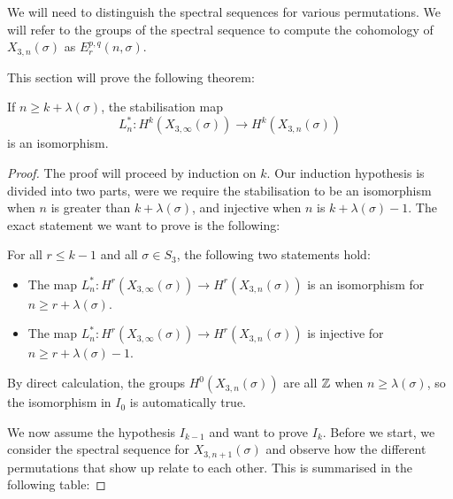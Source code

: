 We will need to distinguish the spectral sequences for various
permutations. We will refer to the groups of the spectral sequence to
compute the cohomology of $X_{3,n}(\sigma)$ as $E_r^{p,q}(n,\sigma)$.

This section will prove the following theorem:
\begin{theorem}
  \label{thm:kostab}
  If $n \geq k + \lambda(\sigma)$, the stabilisation map
  \[ L_{n}^* : H^k(X_{3,\infty}(\sigma)) \to H^k(X_{3,n}(\sigma)) \]
  is an isomorphism.
\end{theorem}

\begin{proof}
The proof will proceed by induction on $k$. Our induction hypothesis
is divided into two parts, were we require the stabilisation to be an
isomorphism when $n$ is greater than $k+\lambda(\sigma)$, and
injective when $n$ is $k+\lambda(\sigma)-1$. The exact statement we
want to prove is the following:
\begin{hypothesis}[$I_{k-1}$]
  For all $r \leq k-1$ and all $\sigma \in S_3$, the following two
  statements hold:
  \begin{itemize}
  \item The map $L_{n}^* : H^r(X_{3,\infty}(\sigma)) \to
    H^r(X_{3,n}(\sigma))$ is an isomorphism for $n \geq r +
    \lambda(\sigma)$.
  \item The map $L_{n}^* : H^r(X_{3,\infty}(\sigma)) \to
    H^r(X_{3,n}(\sigma))$ is injective for $n \geq r +\lambda(\sigma)
    -1$.
  \end{itemize}
\end{hypothesis}

By direct calculation, the
groups $H^0(X_{3,n}(\sigma))$ are all $\mathbb{Z}$ when $n \geq
\lambda(\sigma)$, so the isomorphism in $I_0$ is automatically
true. 

We now assume the hypothesis $I_{k-1}$ and want to prove $I_k$. Before
we start, we consider the spectral sequence for $X_{3,n+1}(\sigma)$
and observe how the different permutations that show up relate to each
other. This is summarised in the following table:


\end{proof}
